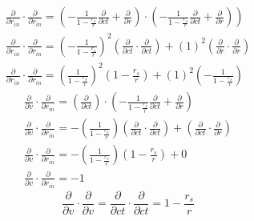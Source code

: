 \begin{equation}
    \begin{array}{l}
        \left.\frac{\partial}{\partial r_{i n}} \cdot \frac{\partial}{\partial r_{i n}}=\left(-\frac{1}{1-\frac{r_s}{r}} \frac{\partial}{\partial c t}+\frac{\partial}{\partial r}\right) \cdot\left(-\frac{1}{1-\frac{r_s}{r}} \frac{\partial}{\partial c t}+\frac{\partial}{\partial r}\right)\right) \\
        \frac{\partial}{\partial r_{i n}} \cdot \frac{\partial}{\partial r_{i n}}=\left(-\frac{1}{1-\frac{r_s}{r}}\right)^2\left(\frac{\partial}{\partial c t} \cdot \frac{\partial}{\partial c t}\right)+(1)^2\left(\frac{\partial}{\partial r} \cdot \frac{\partial}{\partial r}\right)               \\
        \frac{\partial}{\partial r_{i n}} \cdot \frac{\partial}{\partial r_{i n}}=\left(\frac{1}{1-\frac{r_s}{r}}\right)^2\left(1-\frac{r_s}{r}\right)+(1)^2\left(-\frac{1}{1-\frac{r_s}{r}}\right)
    \end{array}
\end{equation}
\begin{equation}
    \begin{array}{l}
        \frac{\partial}{\partial v} \cdot \frac{\partial}{\partial r_{i n}}=\left(\frac{\partial}{\partial c t}\right) \cdot\left(-\frac{1}{1-\frac{r_s}{r}} \frac{\partial}{\partial c t}+\frac{\partial}{\partial r}\right)                                                  \\
        \frac{\partial}{\partial v} \cdot \frac{\partial}{\partial r_{i n}}=-\left(\frac{1}{1-\frac{r_s}{r}}\right)\left(\frac{\partial}{\partial c t} \cdot \frac{\partial}{\partial c t}\right)+\left(\frac{\partial}{\partial c t} \cdot \frac{\partial}{\partial r}\right) \\
        \frac{\partial}{\partial v} \cdot \frac{\partial}{\partial r_{i n}}=-\left(\frac{1}{1-\frac{r_s}{r}}\right)\left(1-\frac{r_s}{r}\right)+0                                                                                                                              \\
        \frac{\partial}{\partial v} \cdot \frac{\partial}{\partial r_{i n}}=-1
    \end{array}
\end{equation}
\begin{equation}
    \frac{\partial}{\partial v} \cdot \frac{\partial}{\partial v}=\frac{\partial}{\partial c t} \cdot \frac{\partial}{\partial c t}=1-\frac{r_s}{r}
\end{equation}


